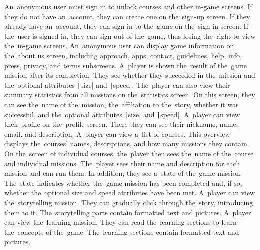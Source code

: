 \pagebreak
\begin{enumerate}[label=\textbf{F\arabic*}, ref=F\arabic*]
     An~anonymous user must sign in to unlock courses and other in-game screens.
    If they do not have an~account, they can create one on the~sign-up screen.
    If they already have an~account, they can sign in to the~game on the~sign-in screen.
    If the~user is signed in, they can sign out of the~game, thus losing the~right to view the~in-game screens.
     An~anonymous user can display game information on the~about us screen, including approach, apps, contact, guidelines, help, info, press, privacy, and terms subscreens.
     A~player is shown the~result of the~game mission after its completion.
    They see whether they succeeded in the~mission and the~optional attributes \texttt|size| and \texttt|speed|.
    The~player can also view their summary statistics from all missions on the~statistics screen.
    On this screen, they can see the~name of the~mission, the~affiliation to the~story, whether it was successful, and the~optional attributes \texttt|size| and \texttt|speed|.
     A~player can view their profile on the~profile screen.
    There they can see their nickname, name, email, and description.
     A~player can view a~list of courses.
    This overview displays the~courses' names, descriptions, and how many missions they contain.
    On the~screen of individual courses, the~player then sees the~name of the~course and individual missions.
    The~player sees their name and description for each mission and can run them.
    In addition, they see a~state of the~game mission.
    The~state indicates whether the~game mission has been completed and, if so, whether the~optional size and speed attributes have been met.
     A~player can view the~storytelling mission.
    They can gradually click through the~story, introducing them to it.
    The~storytelling parts contain formatted text and pictures.
     A~player can view the~learning mission.
    They can read the~learning sections to learn the~concepts of the~game.
    The~learning sections contain formatted text and pictures. 
    

\end{enumerate}
